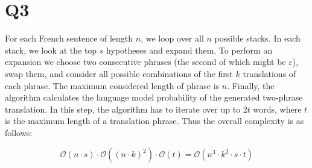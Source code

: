 \section*{Q3}
For each French sentence of length $n$, we loop over all $n$ possible
stacks. In each stack, we look at the top $s$ hypotheses and expand them. To
perform an expansion we choose two consecutive phrases (the second of which
might be $\varepsilon$), swap them, and consider all possible combinations
of the first $k$ translations of each phrase. The maximum considered length
of phrase is $n$. Finally, the algorithm calculates the language model
probability of the generated two-phrase translation. In this step, the
algorithm has to iterate over up to $2 t$ words, where $t$ is the maximum
length of a translation phrase. Thus the overall complexity is as follows:

\[
\mathcal{O}(n \cdot s) \cdot \mathcal{O}({(n \cdot k)}^2)
\cdot \mathcal{O}(t)
= \mathcal{O}(n^3 \cdot k^2 \cdot s \cdot t)
\]
